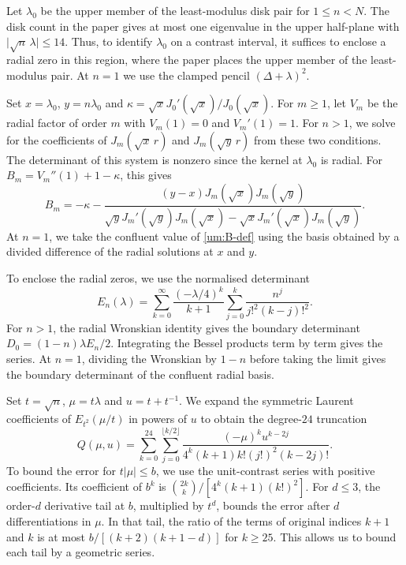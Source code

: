 \documentclass[a4paper,11pt]{amsart}
\numberwithin{equation}{section}
\theoremstyle{plain}
\theoremstyle{definition}
\begin{document}
Let \(\lambda_0\) be the upper member of the least-modulus disk
pair for \(1\le n<N\). The disk count in the paper gives at most one
eigenvalue in the upper half-plane with
\(\lvert\sqrt n\,\lambda\rvert\le14\). Thus, to identify \(\lambda_0\)
on a contrast interval, it suffices to enclose a radial zero in this
region, where the paper places the upper member of the least-modulus
pair. At \(n=1\) we use the clamped pencil \((\Delta+\lambda)^2\).

Set \(x=\lambda_0\), \(y=n\lambda_0\) and
\(\kappa=\sqrt{x}J_0'(\sqrt{x})/J_0(\sqrt{x})\).
For \(m\ge1\), let \(V_m\) be the radial factor of order \(m\) with
\(V_m(1)=0\) and \(V_m'(1)=1\). For \(n>1\), we solve for the
coefficients of \(J_m(\sqrt{x}\,r)\) and \(J_m(\sqrt{y}\,r)\) from
these two conditions. The determinant of this system is nonzero
since the kernel at \(\lambda_0\) is radial. For
\(B_m=V_m''(1)+1-\kappa\), this gives
\begin{equation}\label{um:B-def}
 B_m=-\kappa
 -\frac{(y-x)J_m(\sqrt x)J_m(\sqrt y)}
 {\sqrt yJ_m'(\sqrt y)J_m(\sqrt x)
       -\sqrt xJ_m'(\sqrt x)J_m(\sqrt y)}.
\end{equation}
At \(n=1\), we take the confluent value of \eqref{um:B-def} using
the basis obtained by a divided difference of the radial solutions
at \(x\) and \(y\).

To enclose the radial zeros, we use the normalised determinant
\[
 E_n(\lambda)
 =\sum_{k=0}^\infty\frac{(-\lambda/4)^k}{k+1}
             \sum_{j=0}^k\frac{n^j}{j!^2(k-j)!^2}.
\]
For \(n>1\), the radial Wronskian identity gives the boundary
determinant \(D_0=(1-n)\lambda E_n/2\). Integrating the Bessel
products term by term gives the series. At \(n=1\), dividing
the Wronskian by \(1-n\) before taking the limit gives the boundary
determinant of the confluent radial basis.

Set \(t=\sqrt n\), \(\mu=t\lambda\) and \(u=t+t^{-1}\). We
expand the symmetric Laurent coefficients of \(E_{t^2}(\mu/t)\)
in powers of \(u\) to obtain the degree-\(24\) truncation
\begin{equation}\label{uh:Q}
 Q(\mu,u)=\sum_{k=0}^{24}\sum_{j=0}^{\lfloor k/2\rfloor}
       \frac{(-\mu)^k u^{k-2j}}
              {4^k(k+1)k!(j!)^2(k-2j)!}.
\end{equation}
To bound the error for \(t|\mu|\le b\), we use the unit-contrast
series with positive coefficients. Its coefficient of \(b^k\) is
\(\binom{2k}{k}/[4^k(k+1)(k!)^2]\). For \(d\le3\), the
order-\(d\) derivative tail at \(b\), multiplied by \(t^d\),
bounds the error after \(d\) differentiations in \(\mu\). In that
tail, the ratio of the terms of original indices \(k+1\) and \(k\)
is at most \(b/[(k+2)(k+1-d)]\) for \(k\ge25\). This allows us to
bound each tail by a geometric series.
\end{document}

